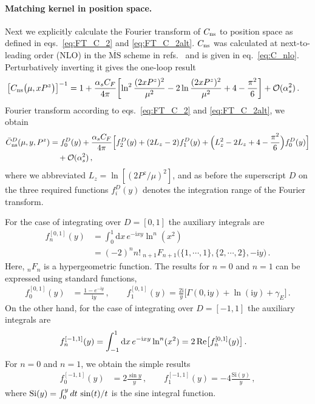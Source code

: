 \documentclass[11pt,a4paper]{article}
\DeclareRobustCommand{\eq}[1]{eq.~\eqref{eq:#1}}
\DeclareRobustCommand{\eqs}[2]{eqs.~\eqref{eq:#1} and \eqref{eq:#2}}
\DeclareRobustCommand{\mycites}[1]{refs.~\cite{#1}}
\newcommand{\MS}{{\overline{\mathrm{MS}}}}
\newcommand{\df}{\mathrm{d}}
\newcommand{\img}{\mathrm{i}}
\newcommand{\cO}{\mathcal{O}}
\newcommand{\nn}{\nonumber}
\newcommand{\as}{\alpha_s}
\newcommand{\ns}{{\rm ns}}
\begin{document}
\paragraph{Matching kernel in position space.}
Next we explicitly calculate the Fourier transform of $C_\ns$ to position space as defined in \eqs{FT_C_2}{FT_C_2alt}.
$C_\ns$ was calculated at next-to-leading order (NLO) in the $\MS$ scheme in \mycites{Ebert:2018gzl,Ebert:2019okf} and is given in \eq{C_nlo}.
Perturbatively inverting it gives the one-loop result
\begin{align} \label{eq:C_nlo_inv}
 \bigl[C_{\ns}\bigl(\mu, x P^z\bigr)\bigr]^{-1} &
 = 1 + \frac{\as C_F}{4\pi} \biggl[ \ln^2\frac{(2 x P^z)^2}{\mu^2}
     - 2 \ln\frac{(2 x P^z)^2}{\mu^2} + 4 - \frac{\pi^2}{6} \biggr] + \cO(\as^2)
\,.\end{align}
Fourier transform according to \eqs{FT_C_2}{FT_C_2alt}, we obtain
\begin{align} \label{eq:FT_Cnv_nlo}
 \bar C_\ns^D(\mu, y, P^z) &
 = f_0^D(y) + \frac{\as C_F}{4\pi} \Bigl[f_2^D(y) + (2 L_z - 2) f_1^D(y) + \Bigl( L_z^2  - 2 L_z + 4 - \frac{\pi^2}{6} \Bigr)  f_0^D(y) \Bigl]
 \nn\\&\quad
 + \cO(\as^2)
\,,\end{align}
where we abbreviated $L_z = \ln[(2 P^z / \mu)^2]$, and as before the superscript $D$ on the three required functions $f_i^D(y)$ denotes the integration range of the Fourier transform.

For the case of integrating over $D = [0,1]$ the auxiliary integrals are
\begin{align}
 f_n^{[0,1]}(y) &= \int_0^1 \df x \, e^{-\img x y} \ln^n(x^2)
 \nn\\&
 = (-2)^n n! ~ {}_{n+1}F_{n+1}\bigl(\{1,\cdots,1\}, \{2, \cdots, 2\}, -\img y\bigr)
\,.\end{align}
Here, $_n F _n$ is a hypergeometric function.
The results for $n=0$ and $n=1$ can be expressed using standard functions,
\begin{align}
 f_0^{[0,1]}(y) &= \frac{1 - e^{-\img y}}{\img y}
\,,\qquad
 f_1^{[0,1]}(y) = \frac{2 \img}{y} \bigl[ \Gamma(0, \img y) + \ln(\img y) + \gamma_E \bigr]
\,.\end{align}
%
On the other hand, for the case of  integrating over $D=[-1,1]$ the auxiliary integrals are
\begin{align}
f_n^{[-1,1]}(y) &= \int_{-1}^1 \df x \, e^{-\img x y} \ln^n(x^2)= 2 \, {\rm Re} \bigl[ f_n^{[0,1]}(y) \bigr]
\,.\end{align}
For $n=0$ and $n=1$, we obtain the simple results
\begin{align}
 f_0^{[-1,1]}(y) &= 2 \frac{\sin y}{y}
\,,\qquad
 f_1^{[-1,1]}(y) = -4 \frac{\mathrm{Si}(y)}{y}
\,,\end{align}
where ${\rm Si}(y)=\int_0^y dt\, \sin(t)/t$ is the sine integral function.
\end{document}
